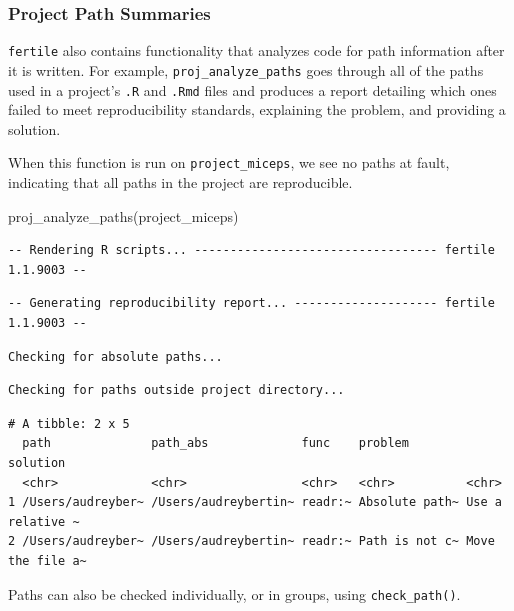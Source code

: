 \documentclass[12pt,twoside]{reedthesis}
\newenvironment{Shaded}{\begin{snugshade}}{\end{snugshade}}
\newcommand{\FunctionTok}[1]{\textcolor[rgb]{0.00,0.00,0.00}{#1}}
\newcommand{\NormalTok}[1]{#1}
\newcommand{\StringTok}[1]{\textcolor[rgb]{0.31,0.60,0.02}{#1}}
\begin{document}
\hypertarget{project-path-summaries}{%
\subsubsection{Project Path Summaries}\label{project-path-summaries}}

\texttt{fertile} also contains functionality that analyzes code for path information after it is written. For example, \texttt{proj\_analyze\_paths} goes through all of the paths used in a project's \texttt{.R} and \texttt{.Rmd} files and produces a report detailing which ones failed to meet reproducibility standards, explaining the problem, and providing a solution.

When this function is run on \texttt{project\_miceps}, we see no paths at fault, indicating that all paths in the project are reproducible.
\begin{Shaded}
\begin{Highlighting}[]
\FunctionTok{proj\_analyze\_paths}\NormalTok{(}\StringTok{\textquotesingle{}project\_miceps\textquotesingle{}}\NormalTok{)}
\end{Highlighting}
\end{Shaded}
\footnotesize
\begin{verbatim}
-- Rendering R scripts... ---------------------------------- fertile 1.1.9003 --
\end{verbatim}
\begin{verbatim}
-- Generating reproducibility report... -------------------- fertile 1.1.9003 --
\end{verbatim}
\begin{verbatim}
Checking for absolute paths...
\end{verbatim}
\begin{verbatim}
Checking for paths outside project directory...
\end{verbatim}
\begin{verbatim}
# A tibble: 2 x 5
  path              path_abs             func    problem        solution        
  <chr>             <chr>                <chr>   <chr>          <chr>           
1 /Users/audreyber~ /Users/audreybertin~ readr:~ Absolute path~ Use a relative ~
2 /Users/audreyber~ /Users/audreybertin~ readr:~ Path is not c~ Move the file a~
\end{verbatim}
\normalsize

Paths can also be checked individually, or in groups, using \texttt{check\_path()}.
\end{document}

